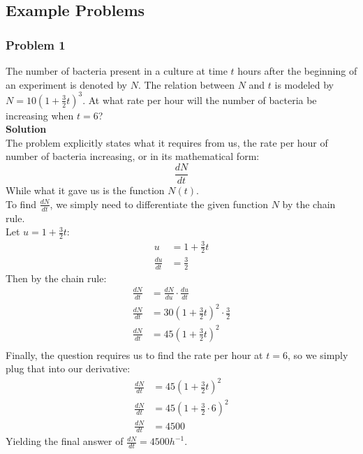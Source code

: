 \documentclass[hidelinks, a4paper, 12pt]{article}
\newcommand{\bd}{\textbf}
\newcommand{\n}{\\[\baselineskip]}
\begin{document}
        \subsection{Example Problems}
            \subsubsection{Problem 1}
                The number of bacteria present in a culture at time $t$ hours after the beginning of an experiment is denoted by $N$.
                The relation between $N$ and $t$ is modeled by $N = 10(1+\frac{3}{2}t)^3$. At what rate per hour will the number of bacteria
                be increasing when $t = 6$?\n
                \bd{Solution}\n
                The problem explicitly states what it requires from us, the rate per hour of number of bacteria increasing, or in its mathematical form:
                \[\frac{dN}{dt}\]
                While what it gave us is the function $N(t)$.\n
                To find $\frac{dN}{dt}$, we simply need to differentiate the given function $N$ by the chain rule.\n
                Let $u = 1+\frac{3}{2}t$:
                \[\begin{split}
                    u &= 1+\frac{3}{2}t\\
                    \frac{du}{dt} &= \frac{3}{2}
                \end{split}\]
                Then by the chain rule:
                \[\begin{split}
                    \frac{dN}{dt} &= \frac{dN}{du} \cdot \frac{du}{dt}\\
                    \frac{dN}{dt} &= 30(1+\frac{3}{2}t)^2 \cdot \frac{3}{2}\\
                    \frac{dN}{dt} &= 45(1+\frac{3}{2}t)^2\\
                \end{split}\]
                Finally, the question requires us to find the rate per hour at $t = 6$, so we simply plug that into our derivative:
                \[\begin{split}
                    \frac{dN}{dt} &= 45(1+\frac{3}{2}t)^2\\
                    \frac{dN}{dt} &= 45(1+\frac{3}{2}\cdot 6)^2\\
                    \frac{dN}{dt} &= 4500
                \end{split}\]
                Yielding the final answer of $\frac{dN}{dt} = 4500h^{-1}$.
            
\end{document}
